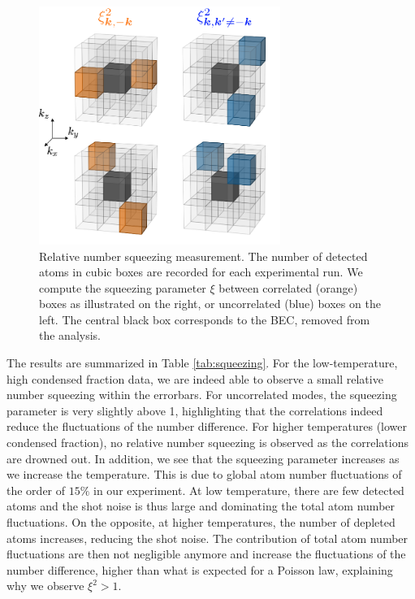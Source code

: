 \begin{figure}
    \centering
    \includegraphics[width=0.7\textwidth]{Fig/Chapter4/squeezing.png}
    \caption{Relative number squeezing measurement. The number of detected atoms in cubic boxes are recorded for each experimental run. We compute the squeezing parameter $\xi$ between correlated (orange) boxes as illustrated on the right, or uncorrelated (blue) boxes on the left. The central black box corresponds to the BEC, removed from the analysis.}
    \label{fig:squeezing}
\end{figure}

The results are summarized in Table \ref{tab:squeezing}. For the low-temperature, high condensed fraction data, we are indeed able to observe a small relative number squeezing within the errorbars. For uncorrelated modes, the squeezing parameter is very slightly above 1, highlighting that the correlations indeed reduce the fluctuations of the number difference. For higher temperatures (lower condensed fraction), no relative number squeezing is observed as the correlations are drowned out. In addition, we see that the squeezing parameter increases as we increase the temperature. This is due to global atom number fluctuations of the order of $15\%$ in our experiment. At low temperature, there are few detected atoms and the shot noise is thus large and dominating the total atom number fluctuations. On the opposite, at higher temperatures, the number of depleted atoms increases, reducing the shot noise. The contribution of total atom number fluctuations are then not negligible anymore and increase the fluctuations of the number difference, higher than what is expected for a Poisson law, explaining why we observe $\xi^2 > 1$.

